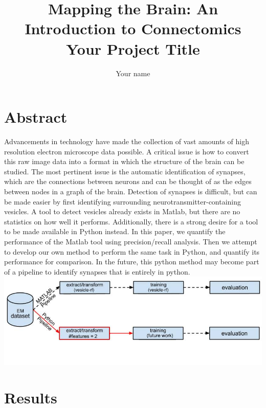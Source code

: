 \documentclass[11pt]{article} %
\title{Mapping the Brain: An Introduction to Connectomics\\Your Project Title}
\author{Your name}
\begin{document}
\maketitle

\section{Abstract}

Advancements in technology have made the collection of vast amounts of high resolution electron microscope data possible. A critical issue is how to convert this raw image data into a format in which the structure of the brain can be studied. The most pertinent issue is the automatic identification of synapses, which are the connections between neurons and can be thought of as the edges between nodes in a graph of the brain. Detection of synapses is difficult, but can be made easier by first identifying surrounding neurotransmitter-containing vesicles. A tool to detect vesicles already exists in Matlab, but there are no statistics on how well it performs. Additionally, there is a strong desire for a tool to be made available in Python instead. In this paper, we quantify the performance of the Matlab tool using precision/recall analysis. Then we attempt to develop our own method to perform the same task in Python, and quantify its performance for comparison. In the future, this python method may become part of a pipeline to identify synapses that is entirely in python.
\includegraphics[scale=.5]{pipeline}
\section{Results}
\end{document}
